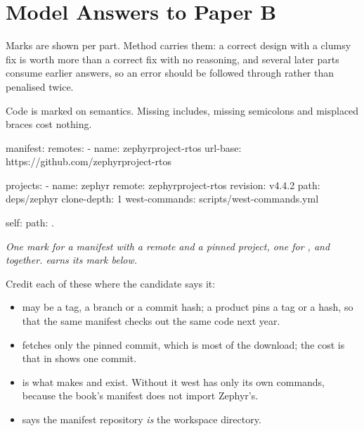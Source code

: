 
\renewcommand{\answerprefix}{ansb}

\chapter{Model Answers to Paper B}
\label{ansb:ch:answers}

Marks are shown per part. Method carries them: a correct design with a clumsy fix is worth more than
a correct fix with no reasoning, and several later parts consume earlier answers, so an error should
be followed through rather than penalised twice.

Code is marked on semantics. Missing includes, missing semicolons and misplaced braces cost nothing.



\begin{yamlcode}
manifest:
  remotes:
    - name: zephyrproject-rtos
      url-base: https://github.com/zephyrproject-rtos

  projects:
    - name: zephyr
      remote: zephyrproject-rtos
      revision: v4.4.2
      path: deps/zephyr
      clone-depth: 1
      west-commands: scripts/west-commands.yml

  self:
    path: .
\end{yamlcode}

\noindent{}

\noindent\emph{One mark for a manifest with a remote and a pinned project, one for ,
 and  together.  earns its mark below.}

Credit each of these where the candidate says it:
\begin{itemize}
  \item \textbf{} may be a tag, a branch or a commit hash; a product pins a tag or a
    hash, so that the same manifest checks out the same code next year.
  \item \textbf{} fetches only the pinned commit, which is most of the
    download; the cost is that  in  shows one commit.
  \item \textbf{} is what makes  and  exist.
    Without it west has only its own commands, because the book's manifest does not import Zephyr's.
  \item \textbf{} says the manifest repository \emph{is} the workspace
    directory.
\end{itemize}

